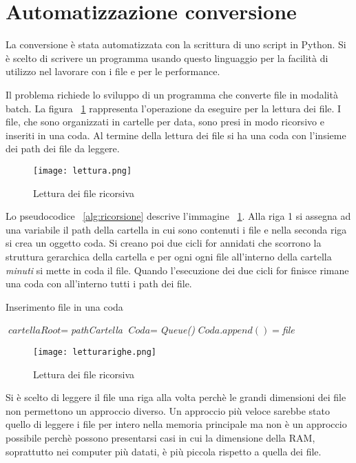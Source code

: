 \documentclass[../main.tex]{subfiles}
\begin{document}
\section{Automatizzazione conversione}
La conversione è stata automatizzata con la scrittura di uno script in Python. Si è scelto di scrivere un programma usando questo linguaggio per la facilità di utilizzo nel lavorare con i file e per le performance.

Il problema richiede lo sviluppo di un programma che converte file in modalità batch.
La figura ~\ref{fig:lettura} rappresenta l'operazione da eseguire per la lettura dei file. I file, che sono organizzati in cartelle per data, sono presi in modo ricorsivo e inseriti in una coda. Al termine della lettura dei file si ha una coda con l'insieme dei path dei file da leggere.
\begin{figure}[H]
				\centering
\texttt{[image: lettura.png]}
				\caption{Lettura dei file ricorsiva}
				\label{fig:lettura}
\end{figure}

Lo pseudocodice ~\ref{alg:ricorsione} descrive l'immagine ~\ref{fig:lettura}. Alla riga 1 si assegna ad una variabile il path della cartella in cui sono contenuti i file e nella seconda riga si crea un oggetto coda. Si creano poi due cicli for annidati che scorrono la struttura gerarchica della cartella e per ogni ogni file all'interno della cartella \textit{minuti} si mette in coda il file. Quando l'esecuzione dei due cicli for finisce rimane una coda con all'interno tutti i path dei file.
\begin{algorithm}
\caption{Inserimento file in una coda}
				\label{alg:ricorsione}
\begin{algorithmic}[1]
				\State $\textit{cartellaRoot} =  $\textit{pathCartella}
				\State $\textit{Coda} = $\textit{Queue()}
						\State $\textit{Coda}.append() = $\textit{file}
						\EndFor
				\EndFor
\end{algorithmic}
\end{algorithm}

\begin{figure}[H]
				\centering
\texttt{[image: letturarighe.png]}
				\caption{Lettura dei file ricorsiva}
				\label{fig:letturarighe}
\end{figure}

Si è scelto di leggere il file una riga alla volta perchè le grandi dimensioni dei file non permettono un approccio diverso. Un approccio più veloce sarebbe stato quello di leggere i file per intero nella memoria principale ma non è un approccio possibile perchè possono presentarsi casi in cui la dimensione della RAM, soprattutto nei computer più datati, è più piccola rispetto a quella dei file.
\end{document}
